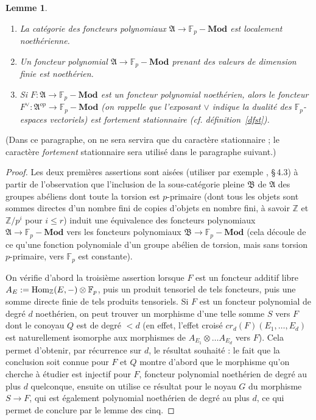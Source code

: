 \documentclass[a4paper,10pt]{article}
\newtheorem{lm}[thm]{Lemme}
\theoremstyle{definition}
\theoremstyle{remark}
\begin{document}
\begin{lm}\label{lmf}
 \begin{enumerate}
  \item La catégorie des foncteurs polynomiaux $\mathfrak{A}\to\mathbb{F}_p-\mathbf{Mod}$ est localement noethérienne.
\item Un foncteur polynomial $\mathfrak{A}\to\mathbb{F}_p-\mathbf{Mod}$ prenant des valeurs de dimension finie est noethérien.
\item Si $F : \mathfrak{A}\to\mathbb{F}_p-\mathbf{Mod}$ est un foncteur polynomial noethérien, alors le foncteur $F^\vee : \mathfrak{A}^{op}\to\mathbb{F}_p-\mathbf{Mod}$ (on rappelle que l'exposant $\vee$ indique la dualité des $\mathbb{F}_p$-espaces vectoriels) est fortement stationnaire (cf. définition~\ref{dfst}).
 \end{enumerate}

\end{lm}

(Dans ce paragraphe, on ne sera servira que du caractère stationnaire ; le caractère {\em fortement} stationnaire sera utilisé dans le paragraphe suivant.)

\begin{proof}
 Les deux premières assertions sont aisées (utiliser par exemple \cite{Dja-pol}, §\,4.3) à partir de l'observation que l'inclusion de la sous-catégorie pleine $\mathfrak{B}$ de $\mathfrak{A}$ des groupes abéliens dont toute la torsion est $p$-primaire (dont tous les objets sont sommes directes d'un nombre fini de copies d'objets en nombre fini, à savoir $\mathbb{Z}$ et $\mathbb{Z}/p^i$ pour $i\leq r$) induit une équivalence des foncteurs polynomiaux $\mathfrak{A}\to\mathbb{F}_p-\mathbf{Mod}$ vers les foncteurs polynomiaux $\mathfrak{B}\to\mathbb{F}_p-\mathbf{Mod}$ (cela découle de ce qu'une fonction polynomiale d'un groupe abélien de torsion, mais sans torsion $p$-primaire, vers $\mathbb{F}_p$ est constante).

On vérifie d'abord la troisième assertion lorsque $F$ est un foncteur additif libre $A_E:={\rm Hom}_\mathbb{Z}(E,-)\otimes\mathbb{F}_p$, puis un produit tensoriel de tels foncteurs, puis une somme directe finie de tels produits tensoriels. Si $F$ est un foncteur polynomial de degré $d$ noethérien, on peut trouver un morphisme d'une telle somme $S$ vers $F$ dont le conoyau $Q$ est de degré $<d$ (en effet, l'effet croisé $cr_d(F)(E_1,\dots,E_d)$ est naturellement isomorphe aux morphismes de $A_{E_1}\otimes\dots A_{E_d}$ vers $F$). Cela permet d'obtenir, par récurrence sur $d$, le résultat souhaité : le fait que la conclusion soit connue pour $F$ et $Q$ montre d'abord que le morphisme qu'on cherche à étudier est injectif pour $F$, foncteur polynomial noethérien de degré au plus $d$ quelconque, ensuite on utilise ce résultat pour le noyau $G$ du morphisme $S\to F$, qui est également polynomial noethérien de degré au plus $d$, ce qui permet de conclure par le lemme des cinq.
\end{proof}
\end{document}
